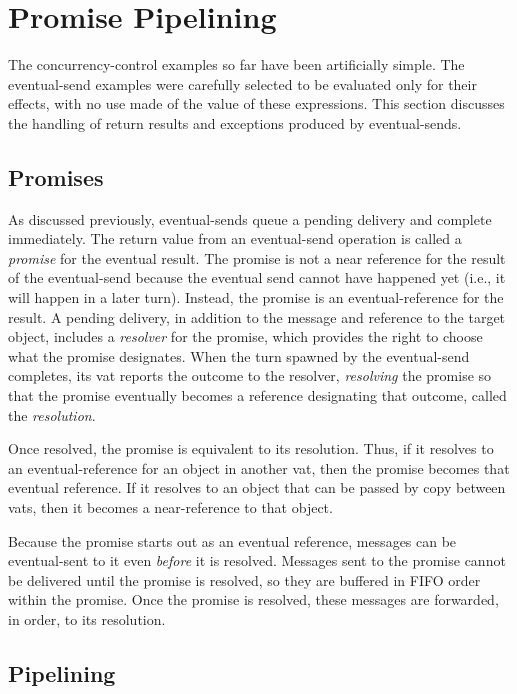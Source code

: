 \documentclass{llncs}
\begin{document}
\section{Promise Pipelining}

The concurrency-control examples so far have been artificially
simple. The eventual-send examples were carefully selected to be
evaluated only for their effects, with no use made of the value of
these expressions. This section discusses the handling of return
results and exceptions produced by eventual-sends.

\subsection{Promises}

As discussed previously, eventual-sends queue a pending delivery and
complete immediately.  The return value from an eventual-send
operation is called a \emph{promise} for the eventual result. The
promise is not a near reference for the result of the eventual-send
because the eventual send cannot have happened yet (i.e., it will
happen in a later turn). Instead, the promise is an eventual-reference
for the result.  A pending delivery, in addition to the message and
reference to the target object, includes a \emph{resolver} for the
promise, which provides the right to choose what the promise
designates. When the turn spawned by the eventual-send completes, its
vat reports the outcome to the resolver, \emph{resolving} the promise
so that the promise eventually becomes a reference designating that
outcome, called the \emph{resolution}.  

Once resolved, the promise is equivalent to its resolution. Thus, if
it resolves to an eventual-reference for an object in another vat,
then the promise becomes that eventual reference. If it resolves to
an object that can be passed by copy between vats, then it becomes a
near-reference to that object.

Because the promise starts out as an eventual reference, messages can
be eventual-sent to it even \emph{before} it is resolved. Messages
sent to the promise cannot be delivered until the promise is resolved,
so they are buffered in FIFO order within the promise. Once the
promise is resolved, these messages are forwarded, in order, to its
resolution.

\subsection{Pipelining}
\end{document}
